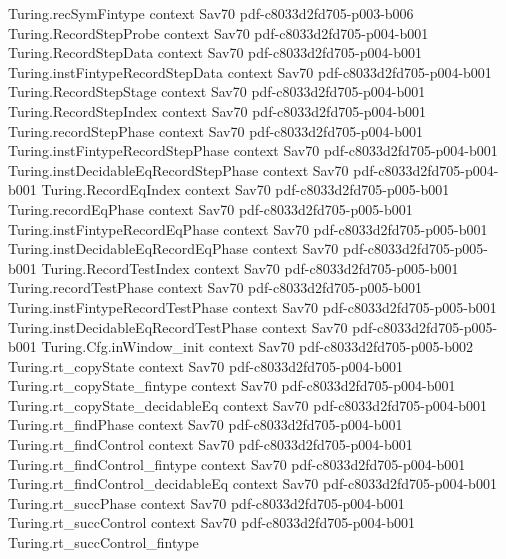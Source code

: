 \begin{theorem}
\proofstep
  {Turing.recSymFintype}
  {context}
  {Sav70}
  {pdf-c8033d2fd705-p003-b006}
\proofstep
  {Turing.RecordStepProbe}
  {context}
  {Sav70}
  {pdf-c8033d2fd705-p004-b001}
\proofstep
  {Turing.RecordStepData}
  {context}
  {Sav70}
  {pdf-c8033d2fd705-p004-b001}
\proofstep
  {Turing.instFintypeRecordStepData}
  {context}
  {Sav70}
  {pdf-c8033d2fd705-p004-b001}
\proofstep
  {Turing.RecordStepStage}
  {context}
  {Sav70}
  {pdf-c8033d2fd705-p004-b001}
\proofstep
  {Turing.RecordStepIndex}
  {context}
  {Sav70}
  {pdf-c8033d2fd705-p004-b001}
\proofstep
  {Turing.recordStepPhase}
  {context}
  {Sav70}
  {pdf-c8033d2fd705-p004-b001}
\proofstep
  {Turing.instFintypeRecordStepPhase}
  {context}
  {Sav70}
  {pdf-c8033d2fd705-p004-b001}
\proofstep
  {Turing.instDecidableEqRecordStepPhase}
  {context}
  {Sav70}
  {pdf-c8033d2fd705-p004-b001}
\proofstep
  {Turing.RecordEqIndex}
  {context}
  {Sav70}
  {pdf-c8033d2fd705-p005-b001}
\proofstep
  {Turing.recordEqPhase}
  {context}
  {Sav70}
  {pdf-c8033d2fd705-p005-b001}
\proofstep
  {Turing.instFintypeRecordEqPhase}
  {context}
  {Sav70}
  {pdf-c8033d2fd705-p005-b001}
\proofstep
  {Turing.instDecidableEqRecordEqPhase}
  {context}
  {Sav70}
  {pdf-c8033d2fd705-p005-b001}
\proofstep
  {Turing.RecordTestIndex}
  {context}
  {Sav70}
  {pdf-c8033d2fd705-p005-b001}
\proofstep
  {Turing.recordTestPhase}
  {context}
  {Sav70}
  {pdf-c8033d2fd705-p005-b001}
\proofstep
  {Turing.instFintypeRecordTestPhase}
  {context}
  {Sav70}
  {pdf-c8033d2fd705-p005-b001}
\proofstep
  {Turing.instDecidableEqRecordTestPhase}
  {context}
  {Sav70}
  {pdf-c8033d2fd705-p005-b001}
\proofstep
  {Turing.Cfg.inWindow_init}
  {context}
  {Sav70}
  {pdf-c8033d2fd705-p005-b002}
\proofstep
  {Turing.rt_copyState}
  {context}
  {Sav70}
  {pdf-c8033d2fd705-p004-b001}
\proofstep
  {Turing.rt_copyState_fintype}
  {context}
  {Sav70}
  {pdf-c8033d2fd705-p004-b001}
\proofstep
  {Turing.rt_copyState_decidableEq}
  {context}
  {Sav70}
  {pdf-c8033d2fd705-p004-b001}
\proofstep
  {Turing.rt_findPhase}
  {context}
  {Sav70}
  {pdf-c8033d2fd705-p004-b001}
\proofstep
  {Turing.rt_findControl}
  {context}
  {Sav70}
  {pdf-c8033d2fd705-p004-b001}
\proofstep
  {Turing.rt_findControl_fintype}
  {context}
  {Sav70}
  {pdf-c8033d2fd705-p004-b001}
\proofstep
  {Turing.rt_findControl_decidableEq}
  {context}
  {Sav70}
  {pdf-c8033d2fd705-p004-b001}
\proofstep
  {Turing.rt_succPhase}
  {context}
  {Sav70}
  {pdf-c8033d2fd705-p004-b001}
\proofstep
  {Turing.rt_succControl}
  {context}
  {Sav70}
  {pdf-c8033d2fd705-p004-b001}
\proofstep
  {Turing.rt_succControl_fintype}

\end{theorem}
